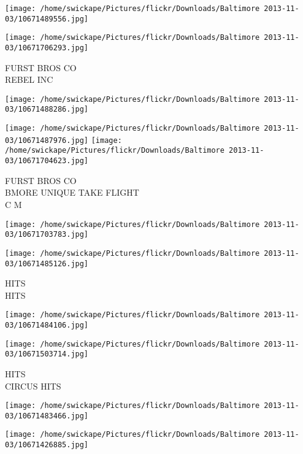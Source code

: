 \documentclass[10pt,letterpaper]{article}
\begin{document}
\texttt{[image: /home/swickape/Pictures/flickr/Downloads/Baltimore 2013-11-03/10671489556.jpg]}

\vspace{0.25in}
\texttt{[image: /home/swickape/Pictures/flickr/Downloads/Baltimore 2013-11-03/10671706293.jpg]}

FURST BROS CO\\
REBEL INC\\
\pagebreak

\texttt{[image: /home/swickape/Pictures/flickr/Downloads/Baltimore 2013-11-03/10671488286.jpg]}

\vspace{0.25in}
\texttt{[image: /home/swickape/Pictures/flickr/Downloads/Baltimore 2013-11-03/10671487976.jpg]}
\texttt{[image: /home/swickape/Pictures/flickr/Downloads/Baltimore 2013-11-03/10671704623.jpg]}

FURST BROS CO\\
BMORE UNIQUE TAKE FLIGHT\\
C M\\
\pagebreak

\texttt{[image: /home/swickape/Pictures/flickr/Downloads/Baltimore 2013-11-03/10671703783.jpg]}

\vspace{0.25in}
\texttt{[image: /home/swickape/Pictures/flickr/Downloads/Baltimore 2013-11-03/10671485126.jpg]}

HITS\\
HITS\\
\pagebreak

\texttt{[image: /home/swickape/Pictures/flickr/Downloads/Baltimore 2013-11-03/10671484106.jpg]}

\vspace{0.25in}
\texttt{[image: /home/swickape/Pictures/flickr/Downloads/Baltimore 2013-11-03/10671503714.jpg]}

HITS\\
CIRCUS HITS\\
\pagebreak

\texttt{[image: /home/swickape/Pictures/flickr/Downloads/Baltimore 2013-11-03/10671483466.jpg]}

\vspace{0.25in}
\texttt{[image: /home/swickape/Pictures/flickr/Downloads/Baltimore 2013-11-03/10671426885.jpg]}
\end{document}
